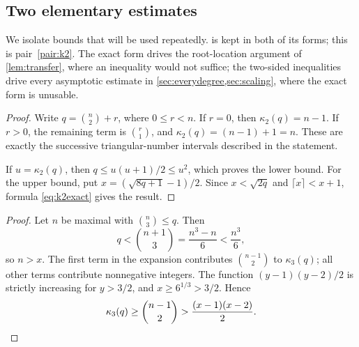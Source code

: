 \documentclass[11pt,letterpaper]{article}
\numberwithin{equation}{section}
\newtheorem{lemma}[theorem]{Lemma}
\theoremstyle{definition}
\theoremstyle{remark}
\newcommand{\kap}{\kappa}
\begin{document}
\subsection{Two elementary estimates}

We isolate bounds that will be used repeatedly.  is kept in both
of its forms; this is pair~\ref{pair:k2}. The exact form drives the
root-location argument of \cref{lem:transfer}, where an inequality would not
suffice; the two-sided inequalities drive every asymptotic estimate in
\cref{sec:everydegree,sec:scaling}, where the exact form is unusable.

\begin{proof}
Write $q=\binom n2+r$, where $0\le r<n$. If $r=0$, then
$\kap_2(q)=n-1$. If $r>0$, the remaining term is $\binom r1$, and
$\kap_2(q)=(n-1)+1=n$. These are exactly the successive triangular-number
intervals described in the statement.

If $u=\kap_2(q)$, then $q\le u(u+1)/2\le u^2$, which proves the lower
bound. For the upper bound, put
$x=(\sqrt{8q+1}-1)/2$. Since $x<\sqrt{2q}$ and
$\lceil x\rceil<x+1$, formula \eqref{eq:k2exact} gives the result.
\end{proof}

\begin{proof}
Let $n$ be maximal with $\binom n3\le q$. Then
\[
 q<\binom{n+1}{3}=\frac{n^3-n}{6}<\frac{n^3}{6},
\]
so $n>x$. The first term in the expansion contributes
$\binom{n-1}{2}$ to $\kap_3(q)$; all other terms contribute nonnegative
integers. The function $(y-1)(y-2)/2$ is strictly increasing for $y>3/2$,
and $x\ge6^{1/3}>3/2$. Hence
\[
 \kap_3(q)\ge\binom{n-1}{2}>\frac{(x-1)(x-2)}2.
 \qedhere
\]
\end{proof}
\end{document}
